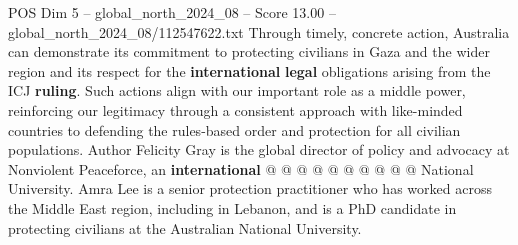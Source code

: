 \begin{textsample}{POS Dim 5 – global\_north\_2024\_08 – Score 13.00 – global\_north\_2024\_08/112547622.txt}
Through timely, concrete action, Australia can demonstrate its commitment to protecting civilians in Gaza and the wider region and its respect for the \textbf{international} \textbf{legal} obligations arising from the ICJ \textbf{ruling}.
Such actions align with our important role as a middle power, reinforcing our legitimacy through a consistent approach with like-minded countries to defending the rules-based order and protection for all civilian populations.
Author Felicity Gray is the global director of policy and advocacy at Nonviolent Peaceforce, an \textbf{international} @ @ @ @ @ @ @ @ @ @ National University.
Amra Lee is a senior protection practitioner who has worked across the Middle East region, including in Lebanon, and is a PhD candidate in protecting civilians at the Australian National University.

\end{textsample}
